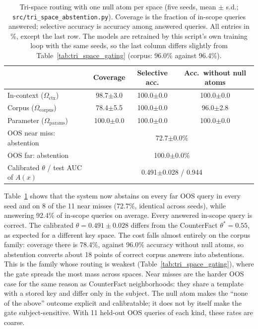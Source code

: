\documentclass[preprint,12pt]{elsarticle}
\newcommand{\Om}{\Omega}
\newif\ifmarkchanges
\newcommand{\rev}[1]{#1}
\newcommand{\revii}[1]{\ifmarkchanges{\color{blue}#1}\else#1\fi}
\begin{document}
\begin{table}[t]
\centering
\caption{\rev{Tri-space routing with one null atom per space (five seeds, mean $\pm$ s.d.; \texttt{src/tri\_space\_abstention.py}). Coverage is the fraction of in-scope queries answered; selective accuracy is accuracy among answered queries. All entries in \%, except the last row.} \revii{The models are retrained by this script's own training loop with the same seeds, so the last column differs slightly from Table~\ref{tab:tri_space_gating} (corpus: 96.0\% against 96.4\%).}}
\label{tab:abstention}
\vspace{0.5em}
\footnotesize
\begin{tabular}{@{}lccc@{}}
\toprule
 & Coverage & Selective acc. & Acc.\ without null atoms \\
\midrule
In-context ($\Om_{\mathrm{ctx}}$) & 98.7$\pm$3.0 & 100.0$\pm$0.0 & 100.0$\pm$0.0 \\
Corpus ($\Om_{\mathrm{corpus}}$) & 78.4$\pm$5.5 & 100.0$\pm$0.0 & 96.0$\pm$2.8 \\
Parameter ($\Om_{\mathrm{params}}$) & 100.0$\pm$0.0 & 100.0$\pm$0.0 & 100.0$\pm$0.0 \\
\midrule
OOS near miss: abstention & \multicolumn{3}{c}{72.7$\pm$0.0\%} \\
OOS far: abstention & \multicolumn{3}{c}{100.0$\pm$0.0\%} \\
Calibrated $\theta$ / test AUC of $A(x)$ & \multicolumn{3}{c}{0.491$\pm$0.028 / 0.944} \\
\bottomrule
\end{tabular}
\end{table}

\rev{Table~\ref{tab:abstention} shows that the system now abstains on every far OOS query in every seed and on 8 of the 11 near misses (72.7\%, identical across seeds), while answering 92.4\% of in-scope queries on average. Every answered in-scope query is correct. The calibrated $\theta=0.491\pm0.028$ differs from the CounterFact $\theta^*=0.55$, as expected for a different key space. The cost falls almost entirely on the corpus family: coverage there is 78.4\%, against 96.0\% accuracy without null atoms, so abstention converts about 18 points of correct corpus answers into abstentions. This is the family whose routing is weakest (Table~\ref{tab:tri_space_gating}), where the gate spreads the most mass across spaces. Near misses are the harder OOS case for the same reason as CounterFact neighborhoods: they share a template with a stored key and differ only in the subject. The null atom makes the ``none of the above'' outcome explicit and calibratable; it does not by itself make the gate subject-sensitive. With 11 held-out OOS queries of each kind, these rates are coarse.}
\end{document}
